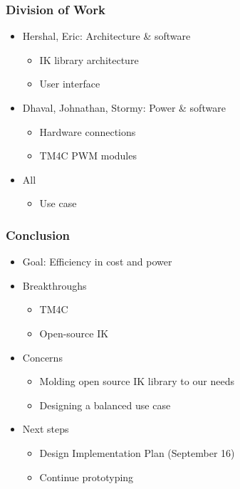 \documentclass[10pt, compress]{beamer}
\begin{document}
\begin{frame}[fragile]
  \frametitle{Division of Work}
  \begin{itemize}
    \item Hershal, Eric: Architecture \& software
      \begin{itemize}[label=$\circ$]
        \item IK library architecture
        \item User interface
      \end{itemize}
    \item Dhaval, Johnathan, Stormy: Power \& software
      \begin{itemize}[label=$\circ$]
        \item Hardware connections
        \item TM4C PWM modules
      \end{itemize}
    \item All
      \begin{itemize}[label=$\circ$]
        \item Use case
      \end{itemize}
  \end{itemize}
\end{frame}

\begin{frame}[fragile]
  \frametitle{Conclusion}
  \begin{itemize}
    \item Goal: Efficiency in cost and power
    \item Breakthroughs
      \begin{itemize}[label=$\circ$]
        \item TM4C
        \item Open-source IK
      \end{itemize}
    \item Concerns
      \begin{itemize}[label=$\circ$]
        \item Molding open source IK library to our needs
        \item Designing a balanced use case
      \end{itemize}
    \item Next steps
      \begin{itemize}[label=$\circ$]
        \item Design Implementation Plan (September 16)
        \item Continue prototyping
      \end{itemize}
  \end{itemize}
\end{frame}

\end{document}

